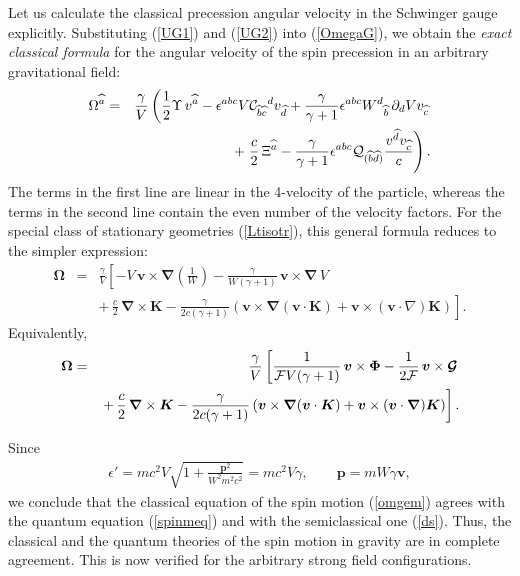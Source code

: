 \documentclass[preprint,showpacs,preprintnumbers,eqsecnum,amsmath,amssymb]{revtex4}
\begin{document}
Let us calculate the classical precession angular velocity in the
Schwinger gauge explicitly. Substituting (\ref{UG1}) and
(\ref{UG2}) into (\ref{OmegaG}), we obtain the {\it exact
classical formula} for the angular velocity of the spin precession
in an arbitrary gravitational field:
\begin{eqnarray}
\Omega^{\widehat{a}} &=& {\frac {\gamma}{V}}\left({\frac 12}{\Upsilon} 
\,v^{\widehat{a}} - \epsilon^{abc}V{\cal C}_{{\widehat{b}}{\widehat{c}}}{}^d 
v_{\widehat{d}} + {\frac \gamma{\gamma + 1}}\epsilon^{abc}W^d{}_{\widehat{b}}
\,\partial_dVv_{\widehat{c}}\right.\nonumber\\
&& +\left.{\frac c2}\,{\Xi}^{\widehat{a}} - {\frac \gamma{\gamma +
1}} \epsilon^{abc}{\cal Q}_{(\widehat{b}\widehat{d})}{\frac
{v^{\widehat{d}} v_{\widehat{c}}} c}\right).\label{OmegaS}
\end{eqnarray}
The terms in the first line are linear in the 4-velocity of the
particle, whereas the terms in the second line contain the even
number of the velocity factors. For the special class of
stationary geometries (\ref{Ltisotr}), this general formula
reduces to the simpler expression:
\begin{eqnarray}
\bm{\Omega} &=& {\frac \gamma V}\left[- V\,\bm{v}\times
\bm{\nabla}\left(\frac1W\right) - {\frac \gamma {W(\gamma +
1)}}\,\bm{v}\times\bm{\nabla}\,V \right.\nonumber\\ &&\left.
+\,{\frac c2}\,\bm{\nabla}\times\bm{K} - {\frac \gamma {2c(\gamma
+ 1)}}\left(\bm{v}\times\bm{\nabla}(\bm{v}\cdot\bm{K})+\bm{v}\times
(\bm{v}\cdot\nabla)\bm{K}\right)\right]. \label{OmegaFv}
\end{eqnarray}
Equivalently,
\begin{eqnarray}
\bm{\Omega} &=& {\frac \gamma V}\left[{\frac 1 {{\cal F}V(\gamma +
1)}} \,\bm{v}\times\bm\Phi -{\frac {1} {2{\cal F}}}\,\bm{v}\times
\mbox{\boldmath ${\cal G}$}\right.\nonumber\\
&&\left. +\,{\frac c2}\,\bm{\nabla}\times\bm{K} -{\frac \gamma{2c(\gamma + 1)}}
\left(\bm{v}\times\bm{\nabla}(\bm{v}\cdot\bm{K})+\bm{v}\times
(\bm{v}\cdot\bm\nabla)\bm{K}\right)\right].\label{OmegaFe}
\end{eqnarray}

Since
\begin{eqnarray}
\epsilon' = mc^2V\sqrt{1 + \frac{\bm{p}^2}{W^2m^2c^2}} =
mc^2V\gamma,\qquad \bm{p} = mW\gamma\bm{v},\label{conne}
\end{eqnarray}
we conclude that the classical equation of the spin motion (\ref{omgem})
agrees with the quantum equation (\ref{spinmeq}) and with the
semiclassical one (\ref{ds}). Thus, the classical and the quantum
theories of the spin motion in gravity are in complete agreement.
This is now verified for the arbitrary strong field
configurations.
\end{document}
